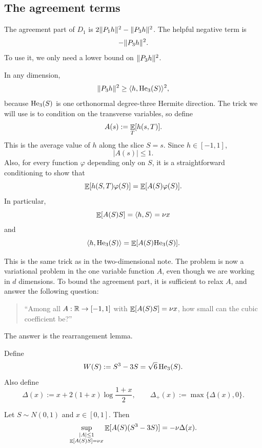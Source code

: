 \subsection{The agreement terms}
\label{sec:agreement}

The agreement part of $D_1$ is $2\lVert P_1h\rVert^2-\lVert P_3h\rVert^2$. The helpful negative term is
\[
        -\lVert P_3h\rVert^2.
\]
To use it, we only need a lower bound on $\lVert P_3h\rVert^2$.

In any dimension,
\[
        \lVert P_3h\rVert^2
        \ge \langle h,\mathrm{He}_3(S)\rangle^2,
\]
because $\mathrm{He}_3(S)$ is one orthonormal degree-three Hermite direction. The trick we will use is to condition on the transverse variables, so define
\[
        A(s):=\mathop{\mathbb{E}}_T[h(s,T)].
\]
This is the average value of $h$ along the slice $S=s$. Since $h\in[-1,1]$,
\[
        |A(s)|\le1.
\]
Also, for every function $\varphi$ depending only on $S$, it is a straightforward conditioning to show that
\[
        \mathop{\mathbb{E}}[h(S,T)\varphi(S)]=\mathop{\mathbb{E}}[A(S)\varphi(S)].
\]
In particular,
\[
        \mathop{\mathbb{E}}[A(S)S]=\langle h,S\rangle=\nu x
\]
and
\[
        \langle h,\mathrm{He}_3(S)\rangle=\mathop{\mathbb{E}}[A(S)\mathrm{He}_3(S)].
\]

This is the same trick as in the two-dimensional note. The problem is now a variational problem in the one variable function $A$, even though we are working in $d$ dimensions. To bound the agreement part, it is sufficient to relax $A$, and answer the following question:

\begin{quote}
``Among all $A:\mathbb{R}\to[-1,1]$ with $\mathop{\mathbb{E}}[A(S)S]=\nu x$, how small can the cubic coefficient be?''
\end{quote}

The answer is the rearrangement lemma.

Define
\[
        W(S):=S^3-3S=\sqrt6\,\mathrm{He}_3(S).
\]
Also define
\[
        \Delta(x):=x+2(1+x)\log\frac{1+x}{2},
        \qquad
        \Delta_+(x):=\max\{\Delta(x),0\}.
\]

\begin{lemma}
Let $S\sim N(0,1)$ and $x\in[0,1]$. Then
\[
        \sup_{\substack{|A|\le1\\ \mathop{\mathbb{E}}[A(S)S]=\nu x}}
        \mathop{\mathbb{E}}[A(S)(S^3-3S)]
        =-\nu\Delta(x).
\]
\end{lemma}

